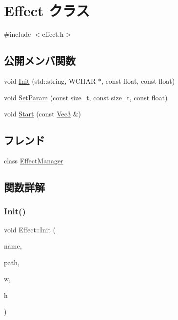 \hypertarget{class_effect}{}\section{Effect クラス}
\label{class_effect}


{\ttfamily \#include $<$effect.\+h$>$}

\subsection*{公開メンバ関数}
\begin{DoxyCompactItemize}
\item 
void \mbox{\hyperlink{class_effect_acedbf09deb825d561ab406a84b64faf3}{Init}} (std\+::string, W\+C\+H\+AR $\ast$, const float, const float)
\item 
void \mbox{\hyperlink{class_effect_a382a3189eb3a9fd9fbd9edf80c661225}{Set\+Param}} (const size\+\_\+t, const size\+\_\+t, const float)
\item 
void \mbox{\hyperlink{class_effect_a8a2e4b2b5c71a95ed864f4fd64b10343}{Start}} (const \mbox{\hyperlink{common_8h_ab1cb35b3a17c398d8ef71d5f779808bf}{Vec3}} \&)
\end{DoxyCompactItemize}
\subsection*{フレンド}
\begin{DoxyCompactItemize}
\item 
class \mbox{\hyperlink{class_effect_aa57a70c5d4b8abc800f69a1681448634}{Effect\+Manager}}
\end{DoxyCompactItemize}


\subsection{関数詳解}
\mbox{\label{class_effect_acedbf09deb825d561ab406a84b64faf3}} 
\subsubsection{\texorpdfstring{Init()}{Init()}}
{\footnotesize\ttfamily void Effect\+::\+Init (\begin{DoxyParamCaption}\item[{std\+::string}]{name,  }\item[{W\+C\+H\+AR $\ast$}]{path,  }\item[{const float}]{w,  }\item[{const float}]{h }\end{DoxyParamCaption})}

